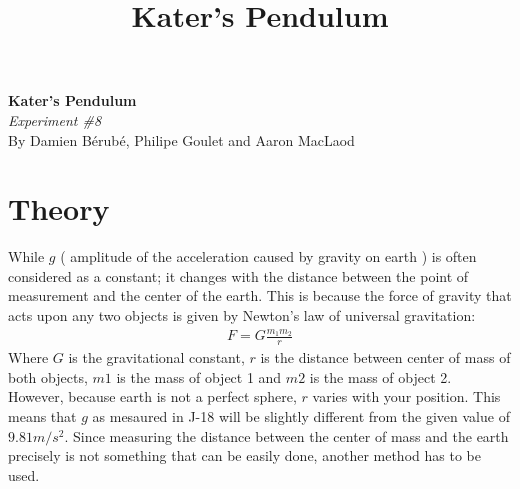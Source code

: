 \documentclass[12pt]{article}
\begin{document}
\title{Kater's Pendulum}
\begin{center}
    \large\textbf{Kater's Pendulum}\\
    \normalsize \textit{Experiment \#8}\\
    By Damien Bérubé, Philipe Goulet and Aaron MacLaod
\end{center}


\section*{Theory}

While $g$ ( amplitude of the acceleration caused by gravity on earth ) is often considered as a constant; it changes with the distance between the point of measurement and the center of the earth. This is because the force of gravity that acts upon any two objects is given by Newton’s law of universal gravitation:
\begin{gather}
    F=G\frac{m_1m_2}{r}
\end{gather}
Where $G$ is the gravitational constant, $r$ is the distance between center of mass of both objects, $m1$ is the mass of object 1 and $m2$ is the mass of object 2.\\

However, because earth is not a perfect sphere, $r$ varies with your position. This means that $g$ as mesaured in J-18 will be slightly different from the given value of $9.81 \si{m/s^2}$. Since measuring the distance between the center of mass and the earth precisely is not something that can be easily done, another method has to be used.\\ 
\end{document}
